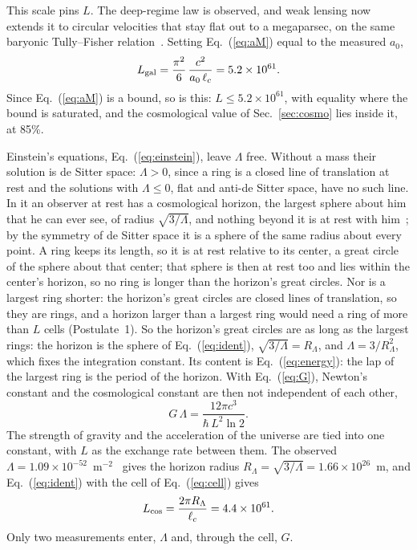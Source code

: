 \documentclass[aps,prd,twocolumn,superscriptaddress,nofootinbib,showkeys]{revtex4-2}
\makeatletter
\newcommand{\lc}{\ell_c}
\newcommand{\RL}{R_\Lambda}
\def\subsection{\@startsection{subsection}{2}{\z@}{0.6cm \@plus1ex \@minus .2ex}{0.35cm}{\normalfont\small\bfseries}}
\makeatother
\begin{document}
This scale pins $L$. The deep-regime law is observed, and weak lensing now extends it to circular velocities that stay flat out to a megaparsec, on the same baryonic Tully--Fisher relation~\cite{mistele2024}. Setting Eq.~(\ref{eq:aM}) equal to the measured $a_0$,
\begin{equation}
L_{\rm gal} = \frac{\pi^2}{6}\,\frac{c^2}{a_0\,\lc} = 5.2\times10^{61}.
\label{eq:Lgal}
\end{equation}
Since Eq.~(\ref{eq:aM}) is a bound, so is this: $L \le 5.2\times10^{61}$, with equality where the bound is saturated, and the cosmological value of Sec.~\ref{sec:cosmo} lies inside it, at 85\%.

\subsection{Cosmological scale: the ring}
\label{sec:cosmo}

Einstein's equations, Eq.~(\ref{eq:einstein}), leave $\Lambda$ free. Without a mass their solution is de Sitter space: $\Lambda > 0$, since a ring is a closed line of translation at rest and the solutions with $\Lambda \le 0$, flat and anti-de Sitter space, have no such line. In it an observer at rest has a cosmological horizon, the largest sphere about him that he can ever see, of radius $\sqrt{3/\Lambda}$, and nothing beyond it is at rest with him~\cite{gibbons1977}; by the symmetry of de Sitter space it is a sphere of the same radius about every point. A ring keeps its length, so it is at rest relative to its center, a great circle of the sphere about that center; that sphere is then at rest too and lies within the center's horizon, so no ring is longer than the horizon's great circles. Nor is a largest ring shorter: the horizon's great circles are closed lines of translation, so they are rings, and a horizon larger than a largest ring would need a ring of more than $L$ cells (Postulate~1). So the horizon's great circles are as long as the largest rings: the horizon is the sphere of Eq.~(\ref{eq:ident}), $\sqrt{3/\Lambda} = \RL$, and $\Lambda = 3/\RL^2$, which fixes the integration constant. Its content is Eq.~(\ref{eq:energy}): the lap of the largest ring is the period of the horizon. With Eq.~(\ref{eq:G}), Newton's constant and the cosmological constant are then not independent of each other,
\begin{equation}
G\,\Lambda = \frac{12\pi c^3}{\hbar\,L^2\ln2}.
\label{eq:Lambda}
\end{equation}
The strength of gravity and the acceleration of the universe are tied into one constant, with $L$ as the exchange rate between them. The observed $\Lambda = 1.09\times10^{-52}$~m$^{-2}$~\cite{planck2018} gives the horizon radius $\RL = \sqrt{3/\Lambda} = 1.66\times10^{26}$~m, and Eq.~(\ref{eq:ident}) with the cell of Eq.~(\ref{eq:cell}) gives
\begin{equation}
L_{\rm cos} = \frac{2\pi\RL}{\lc} = 4.4\times10^{61}.
\label{eq:Lcos}
\end{equation}
Only two measurements enter, $\Lambda$ and, through the cell, $G$.
\end{document}
